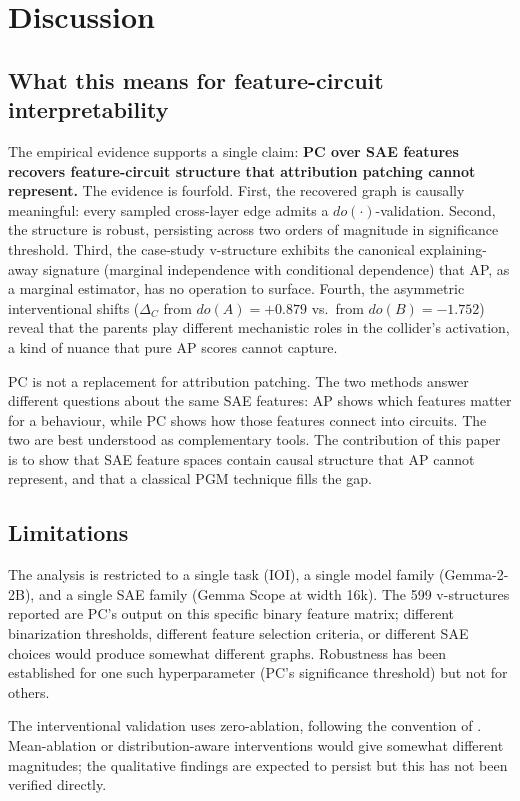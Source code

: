 \documentclass[conference]{IEEEtran}
\begin{document}
\section{Discussion}\label{sec:discuss}

\subsection{What this means for feature-circuit interpretability}
The empirical evidence supports a single claim: \textbf{PC over SAE features recovers feature-circuit structure that attribution patching cannot represent.} The evidence is fourfold. First, the recovered graph is causally meaningful: every sampled cross-layer edge admits a $do(\cdot)$-validation. Second, the structure is robust, persisting across two orders of magnitude in significance threshold. Third, the case-study v-structure exhibits the canonical explaining-away signature (marginal independence with conditional dependence) that AP, as a marginal estimator, has no operation to surface. Fourth, the asymmetric interventional shifts ($\Delta_C$ from $do(A) = +0.879$ vs.\ from $do(B) = -1.752$) reveal that the parents play different mechanistic roles in the collider's activation, a kind of nuance that pure AP scores cannot capture.

PC is not a replacement for attribution patching. The two methods answer different questions about the same SAE features: AP shows which features matter for a behaviour, while PC shows how those features connect into circuits. The two are best understood as complementary tools. The contribution of this paper is to show that SAE feature spaces contain causal structure that AP cannot represent, and that a classical PGM technique fills the gap.

\subsection{Limitations}
The analysis is restricted to a single task (IOI), a single model family (Gemma-2-2B), and a single SAE family (Gemma Scope at width 16k). The 599 v-structures reported are PC's output on this specific binary feature matrix; different binarization thresholds, different feature selection criteria, or different SAE choices would produce somewhat different graphs. Robustness has been established for one such hyperparameter (PC's significance threshold) but not for others.

The interventional validation uses zero-ablation, following the convention of \cite{marks2025}. Mean-ablation or distribution-aware interventions would give somewhat different magnitudes; the qualitative findings are expected to persist but this has not been verified directly.
\end{document}
